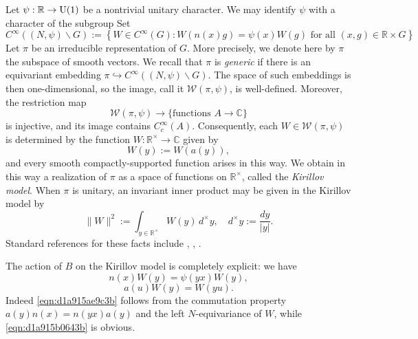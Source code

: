 \documentclass[reqno]{amsart} 
\numberwithin{equation}{section}
\numberwithin{theorem}{section}
\begin{document}
Let $\psi : \mathbb{R} \rightarrow \operatorname{U}(1)$ be a nontrivial unitary character.  We may identify $\psi$ with a character of the subgroup
Set
\begin{equation*}
C^\infty((N,\psi) \backslash G) := \left\{ W \in C^\infty(G): W(n(x) g) = \psi(x) W(g) \text{ for all } (x,g) \in \mathbb{R} \times G \right\}
\end{equation*}
Let $\pi$ be an irreducible representation of $G$.  More precisely, we denote here by $\pi$ the subspace of smooth vectors.  We recall that $\pi$ is \emph{generic} if there is an equivariant embedding $\pi \hookrightarrow C^\infty((N,\psi) \backslash G)$.  The space of such embeddings is then one-dimensional, so the image, call it $\mathcal{W}(\pi,\psi)$, is well-defined.  Moreover, the restriction map
\begin{equation*}
\mathcal{W}(\pi,\psi) \rightarrow \{\text{functions } A \rightarrow \mathbb{C} \}
\end{equation*}
is injective, and its image contains $C_c^\infty(A)$.  Consequently, each $W \in \mathcal{W}(\pi,\psi)$ is determined by the function $W : \mathbb{R}^\times \rightarrow \mathbb{C}$ given by
\begin{equation*}
W(y) := W(a(y)),
\end{equation*}
and every smooth compactly-supported function arises in this way.  We obtain in this way a realization of $\pi$ as a space of functions on $\mathbb{R}^\times$, called the \emph{Kirillov model}.  When $\pi$ is unitary, an invariant inner product may be given in the Kirillov model by
\begin{equation}\label{eqn:d1a915c9af68}
  \lVert W \rVert^2 := \int_{y \in \mathbb{R}^\times } W(y) \, d^\times y, \quad
  d^\times y := \frac{d y}{\lvert y \rvert}.
\end{equation}
Standard references for these facts include \cite[\S6]{MR748505}, \cite[\S10.2]{MR1999922}, \cite{MR2733072}.

The action of $B$ on the Kirillov model is completely explicit: we have
\begin{equation}\label{eqn:d1a915ae9c3b}
n(x) W(y) = \psi(y x) W(y),
\end{equation}
\begin{equation}\label{eqn:d1a915b0643b}
a(u) W(y) = W(y u).
\end{equation}
Indeed \eqref{eqn:d1a915ae9c3b} follows from the commutation property $a(y) n(x) = n(y x) a(y)$ and the left $N$-equivariance of $W$, while \eqref{eqn:d1a915b0643b} is obvious.
\end{document}
